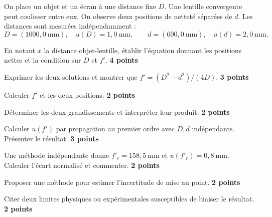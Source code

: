 \label{ex-DM}
On place un objet et un écran à une distance fixe $D$. Une lentille convergente peut coulisser entre eux. On observe deux positions de netteté séparées de $d$. Les distances sont mesurées indépendamment :
\[D=(1000{,}0\ \mathrm{mm}),\quad u(D)=1{,}0\ \mathrm{mm},\qquad
d=(600{,}0\ \mathrm{mm}),\quad u(d)=2{,}0\ \mathrm{mm}.\]
\begin{questions}
\item En notant $x$ la distance objet-lentille, établir l'équation donnant les positions nettes et la condition sur $D$ et $f'$. \textbf{4 points}
\item Exprimer les deux solutions et montrer que $f'=(D^2-d^2)/(4D)$. \textbf{3 points}
\item Calculer $f'$ et les deux positions. \textbf{2 points}
\item Déterminer les deux grandissements et interpréter leur produit. \textbf{2 points}
\item Calculer $u(f')$ par propagation au premier ordre avec $D,d$ indépendants. Présenter le résultat. \textbf{3 points}
\item Une méthode indépendante donne $f'_r=158{,}5\ \mathrm{mm}$ et $u(f'_r)=0{,}8\ \mathrm{mm}$. Calculer l'écart normalisé et commenter. \textbf{2 points}
\item Proposer une méthode pour estimer l'incertitude de mise au point. \textbf{2 points}
\item Citer deux limites physiques ou expérimentales susceptibles de biaiser le résultat. \textbf{2 points}
\end{questions}

